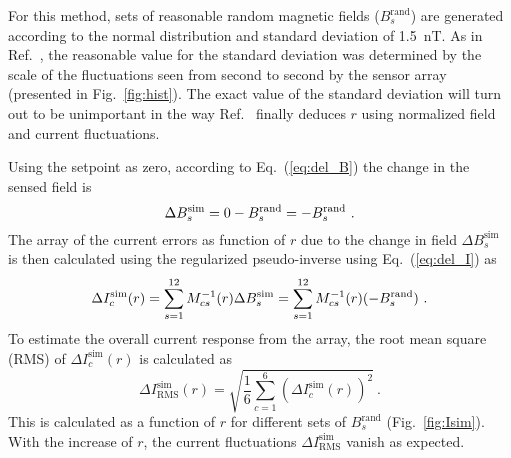For this method, sets of reasonable random magnetic fields ($B_s^{\text{rand}}$) are generated according to the normal distribution and standard deviation of 1.5~nT. As in Ref.~\cite{bea}, the reasonable value for the standard deviation was determined by the scale of the fluctuations seen from second to second by the sensor array (presented in Fig.~\ref{fig:hist}). The exact value of the standard deviation will turn out to be unimportant in the way Ref.~\cite{bea} finally deduces $r$ using normalized field and current fluctuations.

Using the setpoint as zero, according to Eq.~(\ref{eq:del_B}) the change in the sensed field is  
\begin{equation}\label{eq:del_Bs}
    \Delta B_s^{\text{sim}} = 0 - B_s^{\text{rand}}=-B_s^{\text{rand}}~{\rm .}
\end{equation}
The array of the current errors  as function of $r$ due to the change in field $\Delta B_s^{\text{sim}}$ is then calculated using the regularized pseudo-inverse using Eq.~(\ref{eq:del_I}) as
\begin{equation}\label{eq:del_Is}
    \Delta I_c^{\text{sim}}(r) =\sum_{s=1}^{12} M^{-1}_{cs}(r) \Delta B_s^{\text{sim}}=\sum_{s=1}^{12} M^{-1}_{cs}(r) (-B_s^{\text{rand}})~{\rm .}
\end{equation}
To estimate the overall current response from the array, the root mean square (RMS) of $\Delta I_c^{\text{sim}}(r)$ is calculated as
\begin{equation}\label{eq:delta_Isim_rms}
     \Delta I_{\text{RMS}}^{\text{sim}}(r)= \sqrt{\frac{1}{6}\sum_{c=1}^6 (\Delta I_c^{\text{sim}}(r))^2}~\text{.}
\end{equation}
This is calculated as a function of $r$ for different sets of $B_s^{\text{rand}}$ (Fig.~\ref{fig:Isim}). With the increase of $r$, the current fluctuations $\Delta I_{\text{RMS}}^{\text{sim}}$ vanish as expected.




